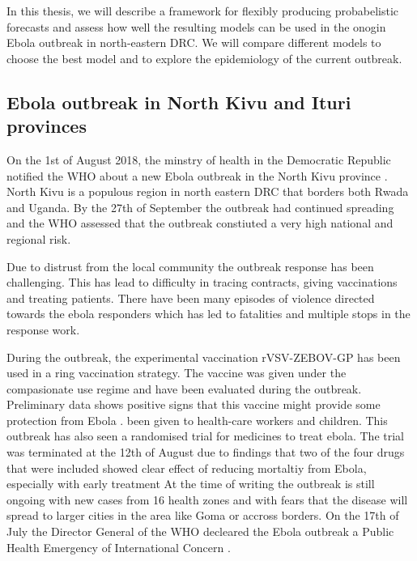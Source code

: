 \documentclass[12pt]{article}
\begin{document}
In this thesis, we will describe a framework for flexibly producing probabelistic forecasts and assess how well the resulting models can be used in the onogin Ebola outbreak in north-eastern DRC. We will compare different models to choose the best model and to explore the epidemiology of the current outbreak. 

\subsection{Ebola outbreak in North Kivu and Ituri provinces}
On the 1st of August 2018, the minstry of health in the Democratic Republic notified the WHO about a new Ebola outbreak in the North Kivu province \cite{worldhealthorganizationEbolaOutbreakDRC2018a}. North Kivu is a populous region in north eastern DRC that borders both Rwada and Uganda. By the 27th of September the outbreak had continued spreading and the WHO assessed that the outbreak constiuted a very high national and regional risk\cite{worldhealthorganizationEbolaOutbreakDRC2018b}.

Due to distrust from the local community the outbreak response has been challenging. This has lead to difficulty in tracing contracts, giving vaccinations and treating patients. There have been many episodes of violence directed towards the ebola responders which has led to fatalities and multiple stops in the response work\cite{worldhealthorganizationEbolaOutbreakDRC2018c,worldhealthorganizationEbolaOutbreakDRC2019a}.

During the outbreak, the experimental vaccination rVSV-ZEBOV-GP has been used in a ring vaccination strategy. The vaccine was given under the compasionate use regime and have been evaluated during the outbreak. Preliminary data shows positive signs that this vaccine might provide some protection from Ebola \cite{organizationPreliminaryResultsEfficacy2019}.  been given to health-care workers and children. This outbreak has also seen a randomised trial for medicines to treat ebola. The trial was terminated at the 12th of August due to findings that two of the four drugs that were included showed clear effect of reducing mortaltiy from Ebola, especially with early treatment \cite{nationalinstituteofallergyandinfectiousdiseasesIndependentMonitoringBoard2019}
At the time of writing the outbreak is still ongoing with new cases from 16 health zones and with fears that the disease will spread to larger cities in the area like Goma or accross borders. On the 17th of July the Director General of the WHO decleared the Ebola outbreak a Public Health Emergency of International Concern \cite{worldhealthorganizationEbolaOutbreakDRC2019}. 
\end{document}
